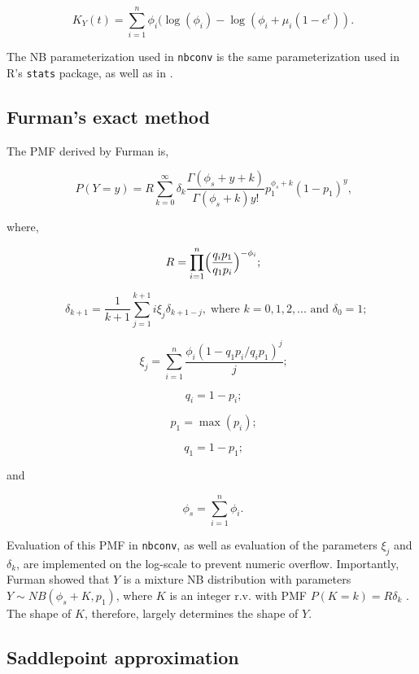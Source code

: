 \documentclass{article}
\begin{document}
\begin{equation}
	\phantom{.} K_Y(t) =  \sum_{i=1}^n \phi_i ( \log( \phi_i ) - \log( \phi_i + \mu_i ( 1-e^t ) ).
\end{equation}

The NB parameterization used in \verb|nbconv| is the same parameterization used in R's \verb|stats| package, as well as in \cite{furmanConvolutionNegativeBinomial2007}. 

\subsection{Furman's exact method}

The PMF derived by Furman is,

\begin{equation} 
	\phantom{,} P(Y=y) = R \sum_{k=0}^\infty \delta_k \frac{\Gamma(\phi_s + y + k)}{\Gamma(\phi_s + k) y! } p_1^{\phi_s + k} (1-p_1)^y , 
\end{equation}

where,

$$ \phantom{;} R = \prod \limits_{i=1}^n \Bigl ( \frac{q_i p_1}{ q_1 p_i }\Bigr )^{-\phi_i} ; $$

$$ \phantom{;} \phantom{,} \delta_{k+1}  = \frac{1}{k+1} \sum \limits_{j=1}^{k+1} i \xi_j \delta_{k+1-j} , \; \mbox{where $k = 0,1,2,...$ and $\delta_0=1$} ; $$


$$ \phantom{;} \xi_j = \sum \limits_{i=1}^n \frac{ \phi_i(1-q_1 p_i /q_i p_1)^j }{ j } ; $$

$$ \phantom{;} q_i = 1-p_i ; $$

$$ \phantom{;} p_1 = \max(p_i) ; $$

$$ \phantom{;} q_1 = 1-p_1 ; $$ 

and

$$ \phantom{.} \phi_s = \sum \limits_{i=1}^n \phi_i . $$

Evaluation of this PMF in \verb|nbconv|, as well as evaluation of the parameters $\xi_j$ and $\delta_k$, are implemented on the log-scale to prevent numeric overflow. Importantly, Furman showed that $Y$ is a mixture NB distribution with parameters $Y \sim NB( \phi_s + K, p_1  )$, where $K$ is an integer r.v. with PMF $P(K=k) = R \delta_k$ \cite{furmanConvolutionNegativeBinomial2007}. The shape of $K$, therefore, largely determines the shape of $Y$. 

\subsection{Saddlepoint approximation}
\end{document}

